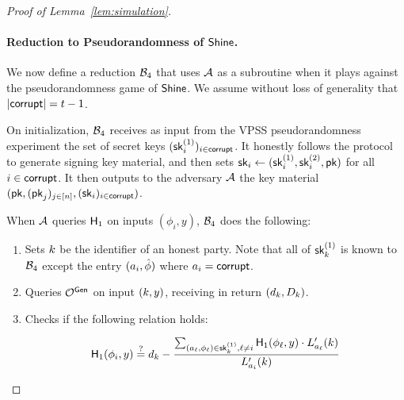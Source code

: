 \begin{proof}[Proof of Lemma~\ref{lem:simulation}]
  \paragraph{Reduction to Pseudorandomness of $\mathsf{Shine}$.}
  We now define a reduction $\mathcal{B}_4$ that uses $\mathcal{A}$ as a subroutine when it plays against the pseudorandomness game of $\mathsf{Shine}$.
  We assume without loss of generality that $\rvert \mathsf{corrupt} \rvert = t-1$.

  On initialization,
  $\mathcal{B}_4$ receives as input from the VPSS pseudorandomness experiment the set of \DVRFOne secret keys
  $(\mathsf{sk}^{(1)}_i)_{i \in \mathsf{corrupt}}$.
  It honestly follows the protocol to generate signing key material,
  and then sets $\mathsf{sk}_i \gets (\mathsf{sk}^{(1)}_i, \mathsf{sk}^{(2)}_i, \mathsf{pk})$ for all $i \in \mathsf{corrupt}$.
  It then outputs to the adversary $\mathcal{A}$ the key material
  $(\mathsf{pk}, (\mathsf{pk}_j)_{j \in [n]}, \allowbreak (\mathsf{sk}_i)_{i \in \mathsf{corrupt}})$.

   When $\mathcal{A}$ queries $\mathsf{H}_1$ on inputs $(\phi_i, y)$,
  $\mathcal{B}_4$ does the following:
  \begin{enumerate}
    \item Sets $k$ be the identifier of an honest party.  Note that all of
    $\mathsf{sk}^{(1)}_k$ is known to $\mathcal{B}_4$ except the entry $(a_i, \hat{\phi})$ where $a_i = \mathsf{corrupt}$.
    \item Queries $\mathcal{O}^{\mathsf{Gen}}$ on input $(k, y)$,
      receiving in return $(d_k, D_k)$.
    \item Checks if the following relation holds:

   \begin{equation}
     \mathsf{H}_1(\phi_i, y) \stackrel{?}{=} d_k -
     \frac{ \sum_{(a_\ell, \phi_\ell) \in \mathsf{sk}^{(1)}_k, \ell \not= i} \mathsf{H}_1(\phi_\ell, y) \cdot L'_{a_\ell}(k)}{ L'_{a_{i}}(k)}
   \end{equation}


\end{enumerate}
\end{proof}
